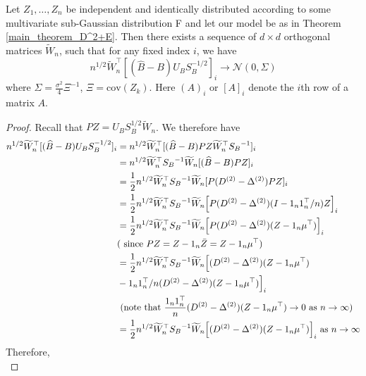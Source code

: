 \begin{lemma}
\label{cov_D^2+E}
  Let $Z_1, \dots, Z_n$ be independent and identically distributed according to some multivariate sub-Gaussian distribution F and let our model be as in Theorem \ref{main_theorem_D^2+E}. Then there exists a sequence of $d \times d$ orthogonal matrices $\tilde{W}_n$, such that for any fixed index $i$, we have
  $$ n^{1/2} \tilde{W}_n^{\top} [(\hat{B} - B) U_B S_B^{-1/2}]_{i} \longrightarrow \mathcal{N}(0, \Sigma)$$
  where $\Sigma  = \frac{\sigma^2}{4} {\Xi}^{-1}$, 
  $\Xi = \mathrm{cov} (Z_k)$. Here $(A)_i$ or $[A]_i$ denote the $i$th row of a matrix $A$. 
\end{lemma}
\begin{proof}
 Recall that $PZ = U_B S_B^{1/2} \tilde{W}_n $. We therefore have
    \begin{align*}
        n^{1/2} \tilde{W}_n^\top [(\hat{B} - B) U_B S_B^{-1/2}]_{i}
        & = n^{1/2} \tilde{W}_n^\top [(\hat{B} - B) PZ \tilde{W}_n^\top {S_B}^{-1}]_{i} \\
        & = n^{1/2} \tilde{W}_n^\top {S_B}^{-1} \tilde{W}_n [(\hat{B} - B)PZ]_{i}\\
        & =  \frac{1}{2} n^{1/2} \tilde{W}_n^\top {S_B}^{-1} \tilde{W}_n [P (D^{(2)}  - \Delta^{(2)}) PZ]_{i}\\
        & = \frac{1}{2} n^{1/2} \tilde{W}_n^\top {S_B}^{-1} \tilde{W}_n \Bigl[ P (D^{(2)}  - \Delta^{(2)}) (I - 1_n 1_n^\top/n)Z\Bigr]_{i} \\
        & = \frac{1}{2} n^{1/2} \tilde{W}_n^\top {S_B}^{-1} \tilde{W}_n \Bigl[ P (D^{(2)}  - \Delta^{(2)}) (Z - 1_n \mu^\top) \Bigr]_{i} \\
        & \textrm{( since } PZ = Z - 1_n \bar{Z} = Z - 1_n \mu^{\top} )\\
        & =  \frac{1}{2} n^{1/2} \tilde{W}_n^\top {S_B}^{-1} \tilde{W}_n \Bigl[  (D^{(2)} - \Delta^{(2)})(Z - 1_n \mu^\top ) \\
        & -  1_n 1_n^\top/n (D^{(2)} - \Delta^{(2)}) (Z - 1_n \mu^\top)    \Bigl]_{i}    \\
        & \textrm{ (note that } \frac{1_n 1_n^\top}{n} (D^{(2)} - \Delta^{(2)}) (Z - 1_n \mu^\top) \rightarrow 0 \textrm{ as } n \rightarrow \infty) \\
        & =  \frac{1}{2} n^{1/2} \tilde{W}_n^\top {S_B}^{-1} \tilde{W}_n \Bigl[ (D^{(2)} - \Delta^{(2)})(Z - 1_n \mu^\top ) \Bigl]_{i}  \textrm{ as } n \rightarrow \infty
    \end{align*} 
Therefore,
    \begin{equation*}

\end{equation*}
\end{proof}
